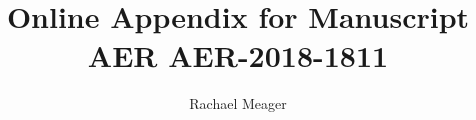 \documentclass[a4paper]{article}
\begin{document}
\title{Online Appendix for Manuscript AER AER-2018-1811}
\author{Rachael Meager}
\maketitle




\end{document}
